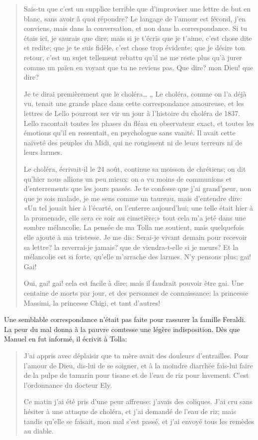 \begin{quote}
Sais-tu que c'est un supplice terrible que d'improviser une lettre de
but en blanc, sans avoir à quoi répondre? Le langage de l'amour est
fécond, j'en conviens, mais dans la conversation, et non dans la
correspondance. Si tu étais ici, je saurais que dire; mais si je t'écris
que je t'aime, c'est chose dite et redite; que je te suis fidèle, c'est
chose trop évidente; que je désire ton retour, c'est un sujet tellement
rebattu qu'il ne me reste plus qu'à jurer comme un païen en voyant que
tu ne reviens pas. Que dire? mon Dieu! que dire?

Je te dirai premièrement que le choléra\ldots{} „ Le choléra, comme on
l'a déjà vu, tenait une grande place dans cette correspondance
amoureuse, et les lettres de Lello pourront ser vir un jour à l'histoire
du choléra de 1837. Lello racontait toutes les phases du fléau en
observateur exact, et toutes les émotions qu'il en ressentait, en
psychologue sans vanité. Il avait cette naïveté des peuples du Midi, qui
ne rougissent ni de leurs terreurs ni de leurs larmes.

Le choléra, écrivait-il le 24 août, continue sa moisson de chrétiens; on
dit qu'hier nous allions un peu mieux: on a vu moins de communions et
d'enterrements que les jours passés. Je te confesse que j'ai grand'peur,
non que je sois malade, je me sens comme un taureau, mais d'entendre
dire: «Un tel jouait hier à l'écarté, on l'enterre aujourd'hui; une
telle était hier à la promenade, elle sera ce soir au cimetière;» tout
cela m'a jeté dans une sombre mélancolie. La pensée de ma Tolla me
soutient, mais quelquefois elle ajoute à ma tristesse. Je me dis:
Serai-je vivant demain pour recevoir sa lettre? la reverrai-je jamais?
que de viendra-t-elle si je meurs? Et la mélancolie est si forte,
qu'elle m'arrache des larmes. N'y pensons plus; gai! Gai!

Oui, gai! gai! cela est facile à dire; mais il faudrait pouvoir être
gai. Une centaine de morts par jour, et des personnes de connaissance:
la princesse Massimi, la princesse Chigi, et tant d'autres!
\end{quote}

Une semblable correspondance n'était pas faite pour rassurer la famille
Feraldi. La peur du mal donna à la pauvre comtesse une légère
indisposition. Dès que Manuel en fut informé, il écrivit à Tolla:

\begin{quote}
J'ai appris avec déplaisir que ta mère avait des douleurs d'entrailles.
Pour l'amour de Dieu, dis-lui de se soigner, et à la moindre diarrhée
fais-lui faire de la pulpe de tamarin pour tisane et de l'eau de riz
pour lavement. C'est l'ordonnance du docteur Ely.

Ce matin j'ai été pris d'une peur affreuse: j'avais des coliques. J'ai
cru sans hésiter à une attaque de choléra, et j'ai demandé de l'eau de
riz; mais tandis qu'elle se faisait, mon mal s'est passé, et j'ai envoyé
tous les remèdes au diable.
\end{quote}

